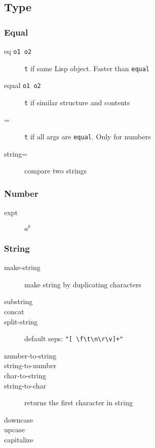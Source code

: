 \subsection{Type}
\subsubsection{Equal}
\begin{description}
\item [eq \textnormal{\texttt{o1 o2}}] \texttt{t} if same Lisp object. Faster than \texttt{equal}
\item [equal \textnormal{\texttt{o1 o2}}] \texttt{t} if similar structure and contents
\item [=] \texttt{t} if all args are \texttt{equal}. Only for numbers
\item [string=] compare two strings
\end{description}

\subsubsection{Number}
\begin{description}
\item [expt ] $a^b$
\end{description}

\subsubsection{String}
\begin{description}
\item [make-string ] make string by duplicating characters
\item [substring ]
\item [concat ]
\item [split-string ] default seps: \verb!"[ \f\t\n\r\v]+"!
\item [number-to-string ]
\item [string-to-number ]
\item [char-to-string ]
\item [string-to-char ] returns the first character in string
\item [downcase ]
\item [upcase ]
\item [capitalize ]
\end{description}

